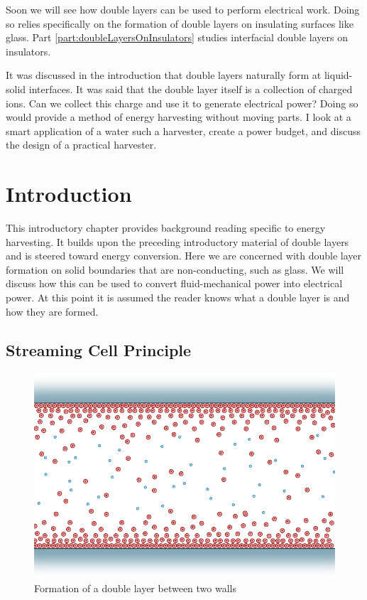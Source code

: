 
Soon we will see how double layers can be used to perform electrical work.
Doing so relies specifically on the formation of double layers on insulating surfaces like glass.
Part \ref{part:doubleLayersOnInsulators} studies interfacial double layers on insulators.

It was discussed in the introduction that double layers naturally form at liquid-solid interfaces.
It was said that the double layer itself is a collection of charged ions.
Can we collect this charge and use it to generate electrical power?
Doing so would provide a method of energy harvesting without moving parts.
I look at a smart application of a water such a harvester, create a power budget, and discuss the design of a practical harvester.

\chapter{Introduction}
  \label{chap:harvesterIntroduction}
  This introductory chapter provides background reading specific to energy harvesting.
  It builds upon the preceding introductory material of double layers and is steered toward energy conversion.
  Here we are concerned with double layer formation on solid boundaries that are non-conducting, such as glass.
  We will discuss how this can be used to convert fluid-mechanical power into electrical power.
  At this point it is assumed the reader knows what a double layer is and how they are formed.

  \section{Streaming Cell Principle}

    \begin{figure}
        \centering
        \includegraphics{content/pt1/01-PowerHarvesting/graphics/intro_walls}
        \caption{\label{fig:doubleLayerBetweenWalls}Formation of a double layer between two  walls}
    \end{figure}

